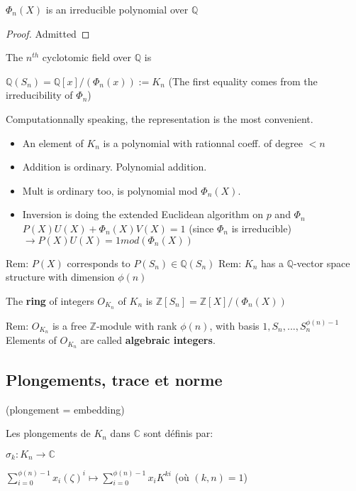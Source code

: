 \begin{proposition}
$\Phi_n(X)$ is an irreducible polynomial over $\mathbb{Q}$
\end{proposition}
\begin{proof}
Admitted
\end{proof}

\begin{definition}
The $n^{th}$ cyclotomic field over $\mathbb{Q}$ is

$\mathbb{Q}(S_n)=\mathbb{Q}[x]/(\Phi_n(x)):=K_n$ (The first equality comes from the irreducibility of $\Phi_n$)
\end{definition}

Computationnally speaking, the representation is the most convenient.
\begin{itemize}
\item An element of $K_n$ is a polynomial with rationnal coeff. of degree $< n$
\item Addition is ordinary. Polynomial addition.
\item Mult is ordinary too, is polynomial mod $\Phi_n(X)$.
\item Inversion is doing the extended Euclidean algorithm on $p$ and $\Phi_n$ $P(X)U(X)+\Phi_n(X)V(X)=1$ (since $\Phi_n$ is irreducible) $\rightarrow P(X)U(X)=1 mod (\Phi_n(X))$
\end{itemize}

Rem: $P(X)$ corresponds to $P(S_n) \in \mathbb{Q}(S_n)$
Rem: $K_n$ has a $\mathbb{Q}$-vector space structure with dimension $\phi(n)$ 

\begin{definition}
The \textbf{ring} of integers $O_{K_n}$ of $K_n$ is $\mathbb{Z}[S_n]=\mathbb{Z}[X]/(\Phi_n(X))$
\end{definition}

Rem: $O_{K_n}$ is a free $\mathbb{Z}$-module with rank $\phi(n)$, with basis $1,S_n,...,S_n^{\phi(n)-1}$
Elements of $O_{K_n}$ are called \textbf{algebraic integers}.

\subsection{Plongements, trace et norme} (plongement = embedding)

\begin{definition}
Les plongements de $K_n$ dans $\mathbb{C}$ sont définis par: 

$\sigma_k: K_n \rightarrow \mathbb{C}$ 

$\sum_{i=0}^{\phi(n)-1} x_i (\zeta)^i \mapsto \sum_{i=0}^{\phi(n)-1} x_i K^{ki} $ (où $(k,n)=1$)
\end{definition}

